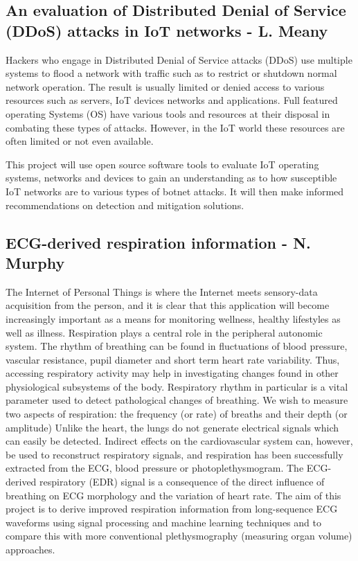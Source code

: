 \documentclass[a4paper]{article}
\begin{document}
\subsection{An evaluation of Distributed Denial of Service (DDoS) attacks in IoT
networks - L. Meany}

Hackers who engage in Distributed Denial of Service attacks (DDoS) use multiple systems to flood a network with traffic such as to restrict or shutdown normal network operation. The result is usually limited or denied access to various resources such as servers, IoT devices networks and applications. Full featured operating Systems (OS) have various tools and resources at their disposal in combating these types of attacks. However, in the IoT world these resources are often limited or not even available.

This project will use open source software tools to evaluate IoT operating systems, networks and devices to gain an understanding as to how susceptible IoT networks are to various types of botnet attacks. It will then make informed recommendations on detection and mitigation solutions.

\subsection{ECG-derived respiration information - N. Murphy}

The Internet of Personal Things is where the Internet meets sensory-data acquisition from the person, and it is clear that this application will become increasingly important as a means for monitoring wellness, healthy lifestyles as well as illness. Respiration plays a central role in the peripheral autonomic system. The rhythm of breathing can be found in fluctuations of blood pressure, vascular resistance, pupil diameter and short term heart rate variability.
Thus, accessing respiratory activity may help in investigating changes found in other physiological subsystems of the body.
Respiratory rhythm in particular is a vital parameter used to detect pathological changes of breathing.
We wish to measure two aspects of respiration: the frequency (or rate) of breaths and their depth (or amplitude)
Unlike the heart, the lungs do not generate electrical signals which can easily be detected. Indirect effects on the cardiovascular system can, however, be used to reconstruct respiratory signals, and respiration has been successfully extracted from the ECG, blood pressure or photoplethysmogram. The ECG-derived respiratory (EDR) signal is a consequence of the direct influence of breathing on ECG morphology and the variation of heart rate. The aim of this project is to derive improved respiration information from long-sequence ECG waveforms using signal processing and machine learning techniques and to compare this with more conventional plethysmography (measuring organ volume) approaches.
\end{document}
